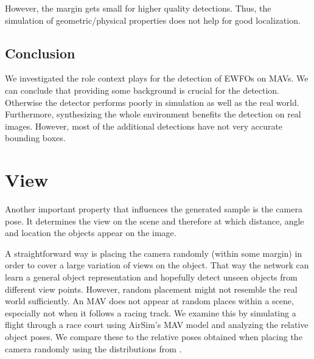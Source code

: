 However, the margin gets small for higher quality detections. Thus, the simulation of geometric/physical properties does not help for good localization.

\subsection{Conclusion}

We investigated the role context plays for the detection of \acp{EWFO} on \acp{MAV}. We can conclude that providing some background is crucial for the detection. Otherwise the detector performs poorly in simulation as well as the real world. Furthermore, synthesizing the whole environment benefits the detection on real images. However, most of the additional detections have not very accurate bounding boxes.

\section{View}

Another important property that influences the generated sample is the camera pose. It determines the view on the scene and therefore at which distance, angle and location the objects appear on the image.

A straightforward way is placing the camera randomly (within some margin) in order to cover a large variation of views on the object. That way the network can learn a general object representation and hopefully detect unseen objects from different view points. However, random  placement might not resemble the real world sufficiently. An \ac{MAV} does not appear at random places within a scene, especially not when it follows a racing track. We examine this by simulating a flight through a race court using AirSim's \ac{MAV} model and analyzing the relative object poses. We compare these to the relative poses obtained when placing the camera randomly using the distributions from .

